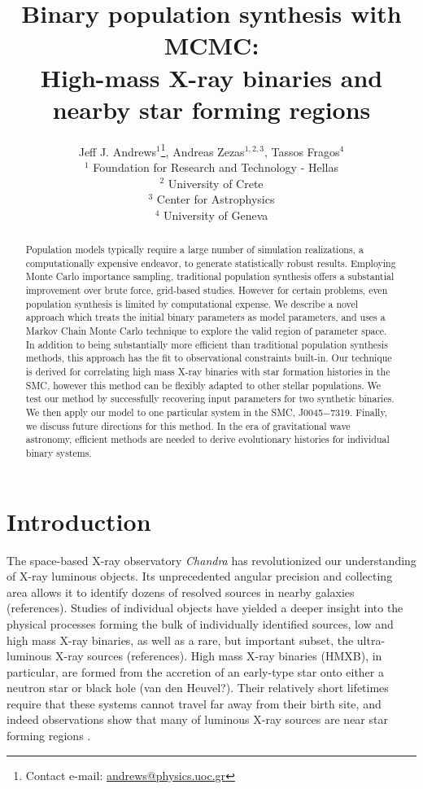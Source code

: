 \documentclass[usenatbib]{mnras}
\title[Binary pop. synth. with MCMC]{Binary population synthesis with MCMC: \\ High-mass X-ray binaries and nearby star forming regions}
\author[J. J. Andrews et al.]{Jeff J. Andrews$^{1}$\thanks{Contact e-mail: \href{mailto:andrews@physics.uoc.gr}{andrews@physics.uoc.gr}}, Andreas Zezas$^{1,2,3}$, Tassos Fragos$^{4}$ \\
$^1$ Foundation for Research and Technology - Hellas \\
$^2$ University of Crete \\
$^3$ Center for Astrophysics \\
$^4$ University of Geneva}
\begin{document}
\label{firstpage}
\pagerange{\pageref{firstpage}--\pageref{lastpage}}
\maketitle

\begin{abstract}
Population models typically require a large number of simulation realizations, a computationally expensive endeavor, to generate statistically robust results. Employing Monte Carlo importance sampling, traditional population synthesis offers a substantial improvement over brute force, grid-based studies. However for certain problems, even population synthesis is limited by computational expense. We describe a novel approach which treats the initial binary parameters as model parameters, and uses a Markov Chain Monte Carlo technique to explore the valid region of parameter space. In addition to being substantially more efficient than traditional population synthesis methods, this approach has the fit to observational constraints built-in. Our technique is derived for correlating high mass X-ray binaries with star formation histories in the SMC, however this method can be flexibly adapted to other stellar populations. We test our method by successfully recovering input parameters for two synthetic binaries. We then apply our model to one particular system in the SMC, J0045$-$7319. Finally, we discuss future directions for this method. In the era of gravitational wave astronomy, efficient methods are needed to derive evolutionary histories for individual binary systems.
\end{abstract}





\section{Introduction}


The space-based X-ray observatory {\it Chandra} has revolutionized our understanding of X-ray luminous objects. Its unprecedented angular precision and collecting area allows it to identify dozens of resolved sources in nearby galaxies (references). Studies of individual objects have yielded a deeper insight into the physical processes forming the bulk of individually identified sources, low and high mass X-ray binaries, as well as a rare, but important subset, the ultra-luminous X-ray sources (references). High mass X-ray binaries (HMXB), in particular, are formed from the accretion of an early-type star onto either a neutron star or black hole (van den Heuvel?). Their relatively short lifetimes require that these systems cannot travel far away from their birth site, and indeed observations show that many of luminous X-ray sources are near star forming regions \citep{zezas02, kaaret04}. 
\end{document}

